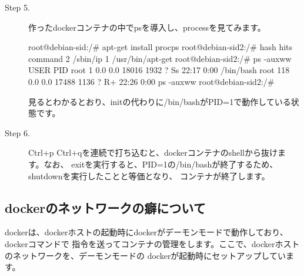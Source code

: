 \documentclass[mingoth,a4paper]{jsarticle}
\begin{document}
\begin{description}
 \item [Step 5.] 作ったdockerコンテナの中でpsを導入し、processを見てみます。

  \begin{commandline}
root@debian-sid:/# apt-get install procps
root@debian-sid2:/# hash
hits	command
   2	/sbin/ip
   1	/usr/bin/apt-get
root@debian-sid2:/# ps -auxww
USER       PID %
root         1  0.0  0.0  18016  1932 ?        Ss   22:17   0:00 /bin/bash
root       118  0.0  0.0  17488  1136 ?        R+   22:26   0:00 ps -auxww
root@debian-sid2:/# 
  \end{commandline}
 見るとわかるとおり、initの代わりに/bin/bashがPID=1で動作している状態です。
 
 \item [Step 6.] Ctrl+p Ctrl+qを連続で打ち込むと、dockerコンテナのshellから抜けます。なお、
exitを実行すると、PID=1の/bin/bashが終了するため、shutdownを実行したことと等価となり、
コンテナが終了します。
 \end{description}  

\subsection{dockerのネットワークの癖について}

 dockerは、dockerホストの起動時にdockerがデーモンモードで動作しており、dockerコマンドで
指令を送ってコンテナの管理をします。ここで、dockerホストのネットワークを、デーモンモードの
dockerが起動時にセットアップしています。
\end{document}
